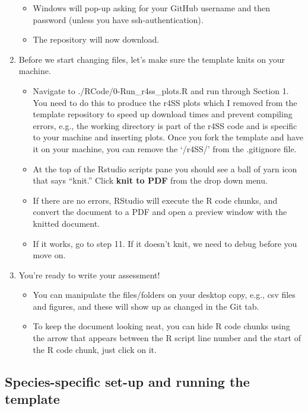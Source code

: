 \documentclass[12pt,]{article}
\providecommand{\tightlist}{%
  \setlength{\itemsep}{0pt}\setlength{\parskip}{0pt}}
\begin{document}
\begin{enumerate}
  \begin{itemize}
  \tightlist
  \item
    Windows will pop-up asking for your GitHub username and then
    password (unless you have ssh-authentication).
  \item
    The repository will now download.
  \end{itemize}
\item
  Before we start changing files, let's make sure the template knits on
  your machine.

  \begin{itemize}
  \tightlist
  \item
    Navigate to ./RCode/0-Run\_r4ss\_plots.R and run through Section 1.
    You need to do this to produce the r4SS plots which I removed from
    the template repository to speed up download times and prevent
    compiling errors, e.g., the working directory is part of the r4SS
    code and is specific to your machine and inserting plots. Once you
    fork the template and have it on your machine, you can remove the
    `/r4SS/' from the .gitignore file.
  \item
    At the top of the Rstudio scripts pane you should see a ball of yarn
    icon that says ``knit.'' Click \textbf{knit to PDF} from the drop
    down menu.
  \item
    If there are no errors, RStudio will execute the R code chunks, and
    convert the document to a PDF and open a preview window with the
    knitted document.
  \item
    If it works, go to step 11. If it doesn't knit, we need to debug
    before you move on.
  \end{itemize}
\item
  You're ready to write your assessment!

  \begin{itemize}
  \tightlist
  \item
    You can manipulate the files/folders on your desktop copy, e.g., csv
    files and figures, and these will show up as changed in the Git tab.
  \item
    To keep the document looking neat, you can hide R code chunks using
    the arrow that appears between the R script line number and the
    start of the R code chunk, just click on it.
  \end{itemize}
\end{enumerate}

\subsection{Species-specific set-up and running the
template}\label{species-specific-set-up-and-running-the-template}
\end{document}
